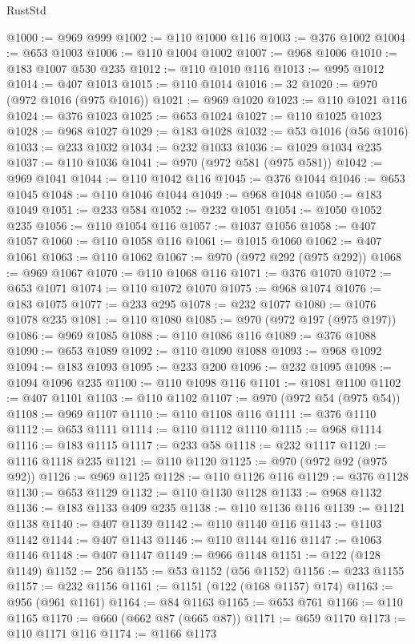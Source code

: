 \begin{lexlean}{RustStd}
\begin{coremodule}
@1000 := @969 @999
@1002 := @110 @1000 @116
@1003 := @376 @1002
@1004 := @653 @1003
@1006 := @110 @1004 @1002
@1007 := @968 @1006
@1010 := @183 @1007 @530 @235
@1012 := @110 @1010 @116
@1013 := @995 @1012
@1014 := @407 @1013
@1015 := @110 @1014
@1016 := 32
@1020 := @970 (@972 @1016 (@975 @1016))
@1021 := @969 @1020
@1023 := @110 @1021 @116
@1024 := @376 @1023
@1025 := @653 @1024
@1027 := @110 @1025 @1023
@1028 := @968 @1027
@1029 := @183 @1028
@1032 := @53 @1016 (@56 @1016)
@1033 := @233 @1032
@1034 := @232 @1033
@1036 := @1029 @1034 @235
@1037 := @110 @1036
@1041 := @970 (@972 @581 (@975 @581))
@1042 := @969 @1041
@1044 := @110 @1042 @116
@1045 := @376 @1044
@1046 := @653 @1045
@1048 := @110 @1046 @1044
@1049 := @968 @1048
@1050 := @183 @1049
@1051 := @233 @584
@1052 := @232 @1051
@1054 := @1050 @1052 @235
@1056 := @110 @1054 @116
@1057 := @1037 @1056
@1058 := @407 @1057
@1060 := @110 @1058 @116
@1061 := @1015 @1060
@1062 := @407 @1061
@1063 := @110 @1062
@1067 := @970 (@972 @292 (@975 @292))
@1068 := @969 @1067
@1070 := @110 @1068 @116
@1071 := @376 @1070
@1072 := @653 @1071
@1074 := @110 @1072 @1070
@1075 := @968 @1074
@1076 := @183 @1075
@1077 := @233 @295
@1078 := @232 @1077
@1080 := @1076 @1078 @235
@1081 := @110 @1080
@1085 := @970 (@972 @197 (@975 @197))
@1086 := @969 @1085
@1088 := @110 @1086 @116
@1089 := @376 @1088
@1090 := @653 @1089
@1092 := @110 @1090 @1088
@1093 := @968 @1092
@1094 := @183 @1093
@1095 := @233 @200
@1096 := @232 @1095
@1098 := @1094 @1096 @235
@1100 := @110 @1098 @116
@1101 := @1081 @1100
@1102 := @407 @1101
@1103 := @110 @1102
@1107 := @970 (@972 @54 (@975 @54))
@1108 := @969 @1107
@1110 := @110 @1108 @116
@1111 := @376 @1110
@1112 := @653 @1111
@1114 := @110 @1112 @1110
@1115 := @968 @1114
@1116 := @183 @1115
@1117 := @233 @58
@1118 := @232 @1117
@1120 := @1116 @1118 @235
@1121 := @110 @1120
@1125 := @970 (@972 @92 (@975 @92))
@1126 := @969 @1125
@1128 := @110 @1126 @116
@1129 := @376 @1128
@1130 := @653 @1129
@1132 := @110 @1130 @1128
@1133 := @968 @1132
@1136 := @183 @1133 @409 @235
@1138 := @110 @1136 @116
@1139 := @1121 @1138
@1140 := @407 @1139
@1142 := @110 @1140 @116
@1143 := @1103 @1142
@1144 := @407 @1143
@1146 := @110 @1144 @116
@1147 := @1063 @1146
@1148 := @407 @1147
@1149 := @966 @1148
@1151 := @122 (@128 @1149)
@1152 := 256
@1155 := @53 @1152 (@56 @1152)
@1156 := @233 @1155
@1157 := @232 @1156
@1161 := @1151 (@122 (@168 @1157) @174)
@1163 := @956 (@961 @1161)
@1164 := @84 @1163
@1165 := @653 @761
@1166 := @110 @1165
@1170 := @660 (@662 @87 (@665 @87))
@1171 := @659 @1170
@1173 := @110 @1171 @116
@1174 := @1166 @1173

\end{coremodule}
\end{lexlean}
